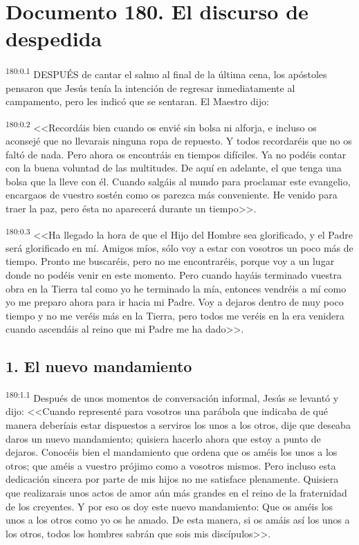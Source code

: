 \chapter{Documento 180. El discurso de despedida}
\par 
\textsuperscript{180:0.1} DESPUÉS de cantar el salmo al final de la última cena, los apóstoles pensaron que Jesús tenía la intención de regresar inmediatamente al campamento, pero les indicó que se sentaran. El Maestro dijo:

\par 
\textsuperscript{180:0.2} <<Recordáis bien cuando os envié sin bolsa ni alforja, e incluso os aconsejé que no llevarais ninguna ropa de repuesto. Y todos recordaréis que no os faltó de nada. Pero ahora os encontráis en tiempos difíciles. Ya no podéis contar con la buena voluntad de las multitudes. De aquí en adelante, el que tenga una bolsa que la lleve con él. Cuando salgáis al mundo para proclamar este evangelio, encargaos de vuestro sostén como os parezca más conveniente. He venido para traer la paz, pero ésta no aparecerá durante un tiempo>>.

\par 
\textsuperscript{180:0.3} <<Ha llegado la hora de que el Hijo del Hombre sea glorificado, y el Padre será glorificado en mí. Amigos míos, sólo voy a estar con vosotros un poco más de tiempo. Pronto me buscaréis, pero no me encontraréis, porque voy a un lugar donde no podéis venir en este momento. Pero cuando hayáis terminado vuestra obra en la Tierra tal como yo he terminado la mía, entonces vendréis a mí como yo me preparo ahora para ir hacia mi Padre. Voy a dejaros dentro de muy poco tiempo y no me veréis más en la Tierra, pero todos me veréis en la era venidera cuando ascendáis al reino que mi Padre me ha dado>>.

\section*{1. El nuevo mandamiento}
\par 
\textsuperscript{180:1.1} Después de unos momentos de conversación informal, Jesús se levantó y dijo: <<Cuando representé para vosotros una parábola que indicaba de qué manera deberíais estar dispuestos a serviros los unos a los otros, dije que deseaba daros un nuevo mandamiento; quisiera hacerlo ahora que estoy a punto de dejaros. Conocéis bien el mandamiento que ordena que os améis los unos a los otros; que améis a vuestro prójimo como a vosotros mismos. Pero incluso esta dedicación sincera por parte de mis hijos no me satisface plenamente. Quisiera que realizarais unos actos de amor aún más grandes en el reino de la fraternidad de los creyentes. Y por eso os doy este nuevo mandamiento: Que os améis los unos a los otros como yo os he amado. De esta manera, si os amáis así los unos a los otros, todos los hombres sabrán que sois mis discípulos>>.

